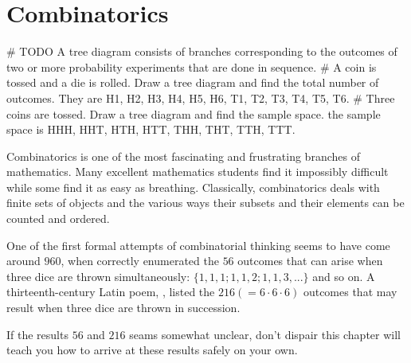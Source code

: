 \chapter{Combinatorics}\label{combi}

# TODO A tree diagram consists of branches corresponding to the outcomes of two or more probability experiments that are done in sequence.
# A coin is tossed and a die is rolled. Draw a tree diagram and find the total number of outcomes. They are H1, H2, H3, H4, H5, H6, T1, T2, T3, T4, T5, T6.
# Three coins are tossed. Draw a tree diagram and find the sample space. the sample space is HHH, HHT, HTH, HTT, THH, THT, TTH, TTT.

Combinatorics is one of the most fascinating and frustrating branches of mathematics. Many excellent mathematics students find it impossibly difficult while some find it as easy as breathing. Classically, combinatorics deals with finite sets of objects and the various ways their subsets and their elements can be counted and ordered.

One of the first formal attempts of combinatorial thinking seems to have come around $960$, when  correctly enumerated the $56$ outcomes that can arise when three dice are thrown simultaneously: $\{1, 1, 1; 1, 1, 2; 1, 1, 3, ...\}$ and so on. A thirteenth-century Latin poem, , listed the $216 (= 6 \cdot 6 \cdot 6)$ outcomes that may result when three dice are thrown in succession.

If the results $56$ and $216$ seams somewhat unclear, don't dispair this chapter will teach you how to arrive at these results safely on your own.


